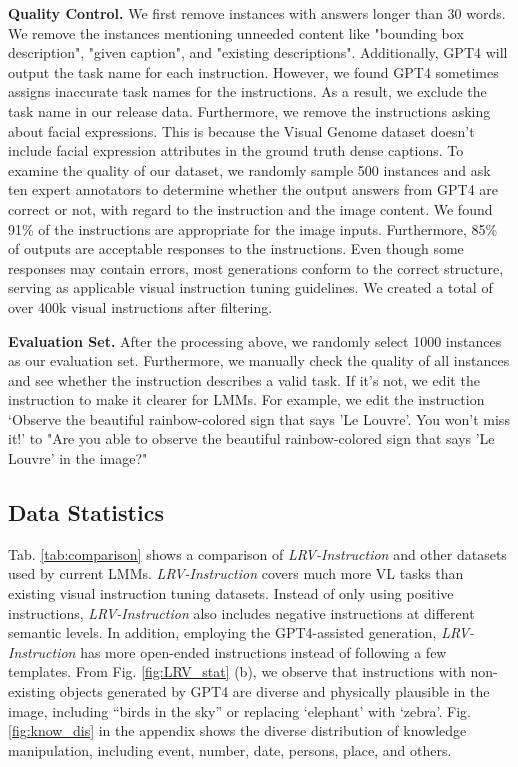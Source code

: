 \textbf{Quality Control. }We first remove instances with answers longer than 30 words. We remove the instances mentioning unneeded content like  "bounding box description", "given caption", and "existing descriptions". Additionally, GPT4 will output the task name for each instruction. However, we found GPT4 sometimes assigns inaccurate task names for the instructions. As a result, we exclude the task name in our release data. Furthermore, we remove the instructions asking about facial expressions. This is because the Visual Genome dataset doesn’t include facial expression attributes in the ground truth dense captions. To examine the quality of our dataset, we randomly sample 500 instances and ask ten expert annotators to determine whether the output answers from GPT4 are correct or not, with regard to the instruction and the image content. We found 91\% of the instructions are appropriate for the image inputs. Furthermore, 85\% of outputs are acceptable responses to the instructions. Even though some responses may contain errors, most generations conform to the correct structure, serving as applicable visual instruction tuning guidelines. We created a total of over 400k visual instructions after filtering. 


\textbf{Evaluation Set. }After the processing above, we randomly select 1000 instances as our evaluation set. Furthermore, we manually check the quality of all instances and see whether the instruction describes a valid task. If it’s not, we edit the instruction to make it clearer for LMMs. For example,  we edit the instruction ‘Observe the beautiful rainbow-colored sign that says 'Le Louvre'. You won't miss it!’ to "Are you able to observe the beautiful rainbow-colored sign that says 'Le Louvre' in the image?"



\subsection{Data Statistics}
Tab. \ref{tab:comparison} shows a comparison of \textit{LRV-Instruction} and other datasets used by current LMMs. \textit{LRV-Instruction} covers much more VL tasks than existing visual instruction tuning datasets. Instead of only using positive instructions, \textit{LRV-Instruction} also includes negative instructions at different semantic levels. In addition, employing the GPT4-assisted generation, \textit{LRV-Instruction} has more open-ended instructions instead of following a few templates. From Fig. \ref{fig:LRV_stat} (b), we observe that instructions with non-existing objects generated by GPT4 are diverse and physically plausible in the image, including “birds in the sky” or replacing ‘elephant’ with ‘zebra’. Fig. \ref{fig:know_dis} in the appendix shows the diverse distribution of knowledge manipulation, including event, number, date, persons, place, and others.


